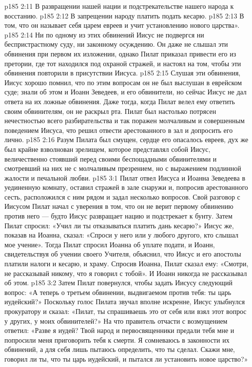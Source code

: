 \vs p185 2:11 \bibnobreakspace В развращении нашей нации и подстрекательстве нашего народа к восстанию.
\vs p185 2:12 \bibnobreakspace В запрещении народу платить подать кесарю.
\vs p185 2:13 \bibnobreakspace В том, что он называет себя царем евреев и учит установлению нового царства».
\vs p185 2:14 \pc Ни по одному из этих обвинений Иисус не подвергся ни беспристрастному суду, ни законному осуждению. Он даже не слышал эти обвинения при первом их изложении, однако Пилат приказал привести его из претории, где тот находился под охраной стражей, и настоял на том, чтобы эти обвинения повторили в присутствии Иисуса.
\vs p185 2:15 Слушая эти обвинения, Иисус хорошо помнил, что по этим вопросам он не был выслушан в еврейском суде; знали об этом и Иоанн Зеведеев, и его обвинители, но сейчас Иисус не дал ответа на их ложные обвинения. Даже тогда, когда Пилат велел ему ответить своим обвинителям, он не раскрыл рта. Пилат был настолько потрясен нечестностью всего разбирательства и так поражен молчаливым и совершенным поведением Иисуса, что решил отвести арестованного в зал и допросить его лично.
\vs p185 2:16 Разум Пилата был смущен, сердце его опасалось евреев, дух же был крайне взволнован зрелищем, которое представлял собой Иисус, величественно стоявший перед своими беспощадными обвинителями и смотревший на них не с молчаливым презрением, но с выражением подлинной жалости и печальной любви.
\vs p185 3:1 Пилат отвел Иисуса и Иоанна Зеведеева в уединенную комнату, оставил стражей в зале снаружи и, попросив арестованного сесть, расположился с ним рядом и задал несколько вопросов. Свой разговор с Иисусом Пилат начал с уверения в том, что он не верит первому обвинению против него --- будто Иисус развращает нацию и подстрекает к бунту. Затем Пилат спросил: «Учил ли ты отказываться платить дань кесарю?» Иисус же, показав на Иоанна, сказал: «Спроси у него или у любого другого, кто слышал мое учение». Тогда Пилат спросил Иоанна об уплате подати, и Иоанн, свидетельствуя об учении своего Учителя, объяснил, что Иисус и его апостолы платили налоги и кесарю, и храму. Спросив Иоанна, Пилат сказал ему: «Смотри, не рассказывай никому, что я говорил с тобой». И Иоанн никогда не рассказывал об этом.
\vs p185 3:2 Затем Пилат повернулся, чтобы задать Иисусу следующий вопрос: «А теперь о третьем обвинении, выдвигаемом против тебя: ты царь иудейский?» Поскольку голос Пилата звучал вполне искренне, Иисус улыбнулся прокуратору и сказал: «Пилат, ты спрашиваешь это от себя или взял этот вопрос у других, у моих обвинителей?» На что правитель отчасти с возмущением ответил: «Разве я иудей? Твой народ и первосвященники предали тебя мне и попросили меня приговорить тебя к смерти. Я сомневаюсь в законности их обвинений, а для себя лишь пытаюсь определить, что ты сделал. Скажи мне, говорил ли ты, что ты царь иудейский, и пытался ли установить новое царство?»
